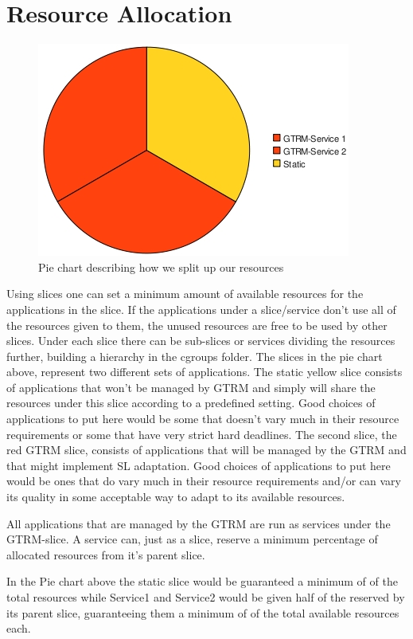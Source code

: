 \documentclass[nobiblatex]{LTHthesis}
\begin{document}
\section{Resource Allocation}
\begin{figure}
    \centering
    \includegraphics{piechart.jpeg}
    \caption{Pie chart describing how we split up our resources}
    \label{fig:Piechart}
\end{figure}

Using slices one can set a minimum amount of available resources for the applications in the slice. If the applications under a slice/service don’t use all of the resources given to them, the unused resources are free to be used by other slices. Under each slice there can be sub-slices or services dividing the resources further, building a hierarchy in the cgroups folder. The slices in the pie chart above, represent two different sets of applications. The static yellow slice consists of applications that won’t be managed by GTRM and simply will share the resources under this slice according to a predefined setting. Good choices of applications to put here would be some that doesn’t vary much in their resource requirements or some that have very strict hard deadlines. The second slice, the red GTRM slice, consists of applications that will be managed by the GTRM and that might implement SL adaptation. Good choices of applications to put here would be ones that do vary much in their resource requirements and/or can vary its quality in some acceptable way to adapt to its available resources.

All applications that are managed by the GTRM are run as services under the GTRM-slice. A service can, just as a slice, reserve a minimum percentage of allocated resources from it’s parent slice.

In the Pie chart above the static slice would be guaranteed a minimum of  of the total resources while Service1 and Service2 would be given half of the  reserved by its parent slice, guaranteeing  them a minimum of  of the total available resources each.
\end{document}

